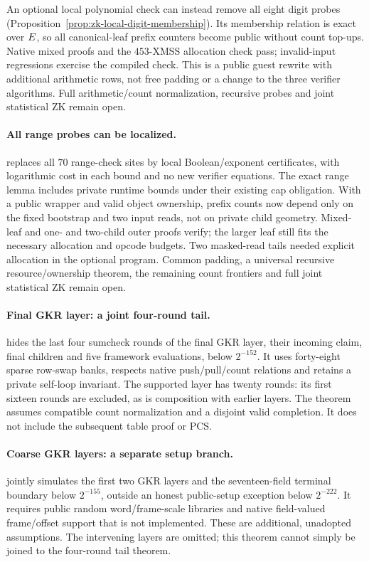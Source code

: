 An optional local polynomial check can instead remove all eight digit probes (Proposition~\ref{prop:zk-local-digit-membership}). Its membership relation is exact over $E$, so all canonical-leaf prefix counters become public without count top-ups. Native mixed proofs and the $453$-XMSS allocation check pass; invalid-input regressions exercise the compiled check. This is a public guest rewrite with additional arithmetic rows, not free padding or a change to the three verifier algorithms. Full arithmetic/count normalization, recursive probes and joint statistical ZK remain open.

\paragraph{All range probes can be localized.}  replaces all $70$ range-check sites by local Boolean/exponent certificates, with logarithmic cost in each bound and no new verifier equations. The exact range lemma includes private runtime bounds under their existing cap obligation. With a public wrapper and valid object ownership, prefix counts now depend only on the fixed bootstrap and two input reads, not on private child geometry. Mixed-leaf and one- and two-child outer proofs verify; the larger leaf still fits the necessary allocation and opcode budgets. Two masked-read tails needed explicit allocation in the optional program. Common padding, a universal recursive resource/ownership theorem, the remaining count frontiers and full joint statistical ZK remain open.

\paragraph{Final GKR layer: a joint four-round tail.}  hides the last four sumcheck rounds of the final GKR layer, their incoming claim, final children and five framework evaluations, below $2^{-152}$. It uses forty-eight sparse row-swap banks, respects native push/pull/count relations and retains a private self-loop invariant. The supported layer has twenty rounds: its first sixteen rounds are excluded, as is composition with earlier layers. The theorem assumes compatible count normalization and a disjoint valid completion. It does not include the subsequent table proof or PCS.

\paragraph{Coarse GKR layers: a separate setup branch.}  jointly simulates the first two GKR layers and the seventeen-field terminal boundary below $2^{-155}$, outside an honest public-setup exception below $2^{-222}$. It requires public random word/frame-scale libraries and native field-valued frame/offset support that is not implemented. These are additional, unadopted assumptions. The intervening layers are omitted; this theorem cannot simply be joined to the four-round tail theorem.

